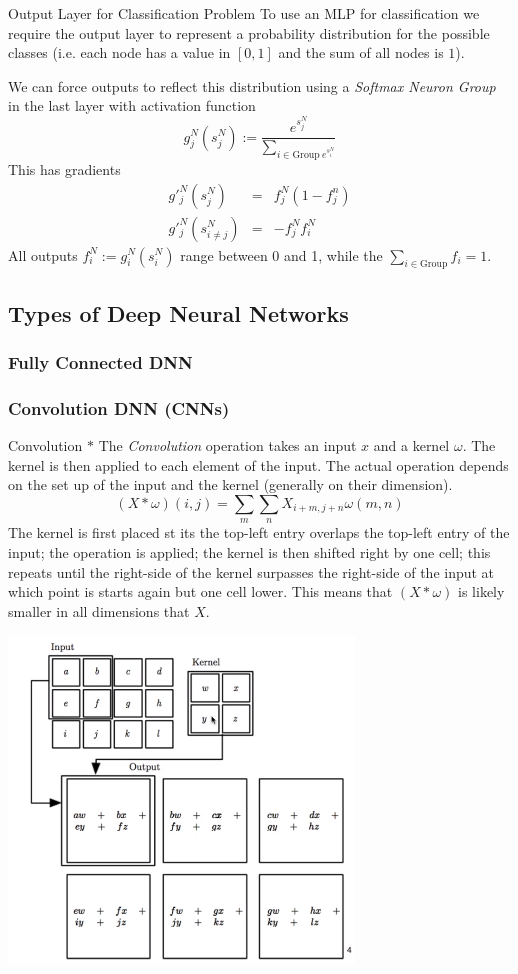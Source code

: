 \documentclass[11pt,a4paper]{article}
\begin{document}
\begin{proposition}{Output Layer for Classification Problem}
  To use an MLP for classification we require the output layer to represent a probability distribution for the possible classes (i.e. each node has a value in $[0,1]$ and the sum of all nodes is $1$).
  \par We can force outputs to reflect this distribution using a \textit{Softmax Neuron Group} in the last layer with activation function
  \[ g_j^N(s_j^N):=\frac{e^{s_j^N}}{\sum_{i\in\text{Group}\ e^{s_i^N}}} \]
  This has gradients
  \[\begin{array}{rcl}
    g'_j^N(s_j^N)&=&f_j^N(1-f_j^n)\\
    g'_j^N(s_{i\neq j}^N)&=&-f_j^Nf_i^N
  \end{array}\]
  All outputs $f_i^N:=g_i^N(s_i^N)$ range between 0 and 1, while the $\sum_{i\in\text{Group}}f_i=1$.
\end{proposition}

\subsection{Types of Deep Neural Networks}

\subsubsection{Fully Connected DNN}


\subsubsection{Convolution DNN (CNNs)}

\begin{definition}{Convolution $*$}
  The \textit{Convolution} operation takes an input $x$ and a kernel $\omega$. The kernel is then applied to each element of the input. The actual operation depends on the set up of the input and the kernel (generally on their dimension).
  \[ (X*\omega)(i,j)=\sum_m\sum_nX_{i+m,j+n}\omega(m,n) \]
  The kernel is first placed st its the top-left entry overlaps the top-left entry of the input; the operation is applied; the kernel is then shifted right by one cell; this repeats until the right-side of the kernel surpasses the right-side of the input at which point is starts again but one cell lower. This means that $(X*\omega)$ is likely smaller in all dimensions that $X$.
  \begin{center}
    \includegraphics[width=.35\textwidth]{2dConvolution.PNG}
  \end{center}
\end{definition}
\end{document}
